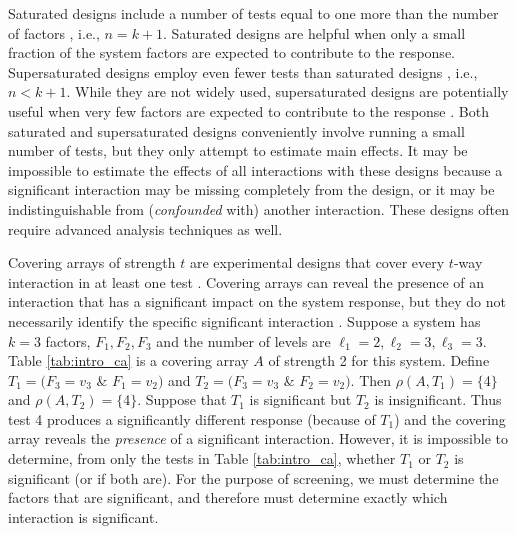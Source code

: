Saturated designs include a number of tests equal to one more than the number of factors \cite{Montgomery-DOE-2017}, i.e., $n = k + 1$.
Saturated designs are helpful when only a small fraction of the system factors are expected to contribute to the response.
Supersaturated designs employ even fewer tests than saturated designs \cite{Montgomery-DOE-2017}, i.e., $n < k + 1$.
While they are not widely used, supersaturated designs are potentially useful when very few factors are expected to contribute to the response \cite{Montgomery-DOE-2017}.
Both saturated and supersaturated designs conveniently involve running a small number of tests, but they only attempt to estimate main effects.
It may be impossible to estimate the effects of all interactions with these designs because a significant interaction may be missing completely from the design, or it may be indistinguishable from ({\em confounded} with) another interaction.
These designs often require advanced analysis techniques as well.

Covering arrays of strength $t$ are experimental designs that cover every $t$-way interaction in at least one test \cite{CMjoco}.
Covering arrays can reveal the presence of an interaction that has a significant impact on the system response, but they do not necessarily identify the specific significant interaction \cite{CMjoco}.
Suppose a system has $k = 3$ factors, $F_1, F_2, F_3$ and the number of levels are $\ell_1 = 2, \ell_2 = 3, \ell_3 = 3$.
Table \ref{tab:intro_ca} is a covering array $A$ of strength 2 for this system.
Define $T_1 = (F_3 = v_3$ \& $F_1 = v_2)$ and $T_2 = (F_3 = v_3$ \& $F_2 = v_2)$.
Then $\rho(A,T_1) = \{$4$\}$ and $\rho(A,T_2) = \{$4$\}$.
Suppose that $T_1$ is significant but $T_2$ is insignificant.
Thus test 4 produces a significantly different response (because of $T_1$) and the covering array reveals the {\em presence} of a significant interaction.
However, it is impossible to determine, from only the tests in Table \ref{tab:intro_ca}, whether $T_1$ or $T_2$ is significant (or if both are).
For the purpose of screening, we must determine the factors that are significant, and therefore must determine exactly which interaction is significant.

